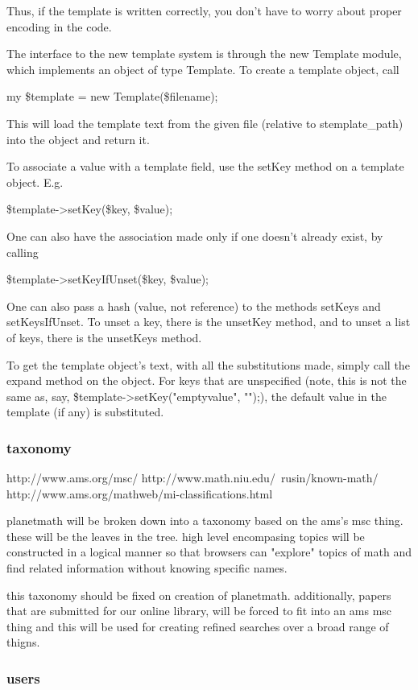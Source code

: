 Thus, if the template is written correctly, you don't have to worry about
proper encoding in the code.

The interface to the new template system is through the new Template module,
which implements an object of type Template.  To create a template object,
call

      my \$template = new Template(\$filename);

This will load the template text from the given file (relative to
stemplate\_path) into the object and return it.

To associate a value with a template field, use the setKey method on a
template object.  E.g.

      \$template->setKey(\$key, \$value);

One can also have the association made only if one doesn't already exist,
by calling

      \$template->setKeyIfUnset(\$key, \$value);

One can also pass a hash (value, not reference) to the methods setKeys and
setKeysIfUnset.  To unset a key, there is the unsetKey method, and to unset
a list of keys, there is the unsetKeys method.

To get the template object's text, with all the substitutions made, simply
call the expand method on the object.  For keys that are unspecified (note,
this is not the same as, say, \$template->setKey("emptyvalue", "");), the
default value in the template (if any) is substituted.

\subsubsection{taxonomy}

http://www.ams.org/msc/
http://www.math.niu.edu/~rusin/known-math/
http://www.ams.org/mathweb/mi-classifications.html

planetmath will be broken down into a taxonomy based on the ams's msc thing. these will be the leaves in the tree. high level encompasing topics will be constructed in a logical manner so that browsers can "explore" topics of math and find related information without knowing specific names.

this taxonomy should be fixed on creation of planetmath. additionally, papers that are submitted for our online library, will be forced to fit into an ams msc thing and this will be used for creating refined searches over a broad range of thigns.

\subsubsection{users}

